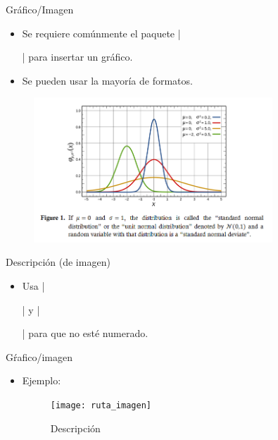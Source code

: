 \begin{frame}[fragile]{Gráfico/Imagen}
  \begin{itemize}
    \item Se requiere comúnmente el paquete \latexinline|\usepackage{graphicx}| para insertar un gráfico.
    \item Se pueden usar la mayoría de formatos.
  \end{itemize}
  \begin{figure}[b]
  \centering
  \includegraphics[width=0.8\textwidth, height=0.8\textheight, keepaspectratio]{assets/grafico.png}
  \end{figure}
\end{frame}


\begin{frame}[fragile]{Descripción (de imagen)}
  \begin{itemize}
    \item Usa \latexinline|\caption{}| y  \latexinline|\caption*{}| para que no esté numerado.
  \end{itemize}
\end{frame}

\begin{frame}[fragile]{Gŕafico/imagen}
  \begin{itemize}
    \item Ejemplo:
          \begin{latexcode}
            \begin{figure}[t] %
              \centering
              \texttt{[image: ruta\_imagen]}
              \caption{Descripción}
            \end{figure}
          \end{latexcode}
  \end{itemize}
\end{frame}


